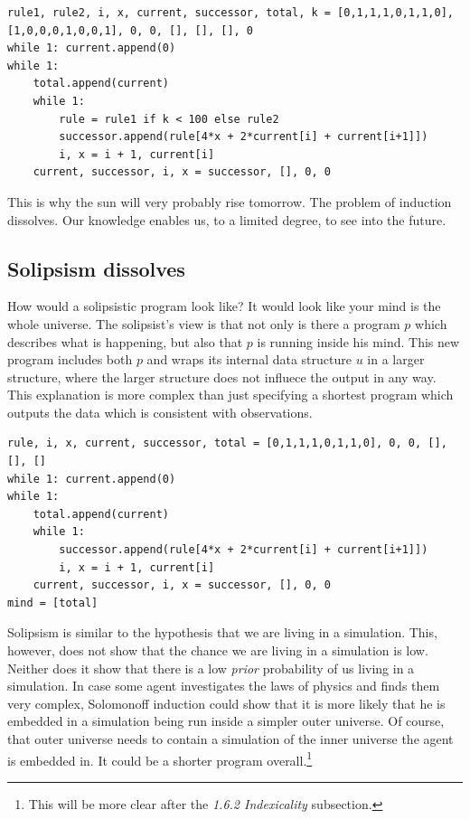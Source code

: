 \begin{lstlisting}[caption={A short program using one rule for the first 100 time steps, another rule from then on. This program is longer than just using the same rule all the time.}]
rule1, rule2, i, x, current, successor, total, k = [0,1,1,1,0,1,1,0], [1,0,0,0,1,0,0,1], 0, 0, [], [], [], 0
while 1: current.append(0)
while 1:
	total.append(current)
	while 1:
		rule = rule1 if k < 100 else rule2
		successor.append(rule[4*x + 2*current[i] + current[i+1]])
		i, x = i + 1, current[i]
	current, successor, i, x = successor, [], 0, 0
\end{lstlisting}

This is why the sun will very probably rise tomorrow.
The problem of induction dissolves.
Our knowledge enables us, to a limited degree, to see into the future.

\newpage

\subsection{Solipsism dissolves}

How would a solipsistic program look like?
It would look like your mind is the whole universe.
The solipsist's view is that not only is there a program $p$ which describes what is happening, but also that $p$ is running inside his mind.
This new program includes both $p$ and wraps its internal data structure $u$ in a larger structure, where the larger structure does not influece the output in any way.
This explanation is more complex than just specifying a shortest program which outputs the data which is consistent with observations. 

\begin{lstlisting}[caption={A solipsistic program.}]
rule, i, x, current, successor, total = [0,1,1,1,0,1,1,0], 0, 0, [], [], []
while 1: current.append(0)
while 1:
	total.append(current)
	while 1:
		successor.append(rule[4*x + 2*current[i] + current[i+1]])
		i, x = i + 1, current[i]
	current, successor, i, x = successor, [], 0, 0
mind = [total]
\end{lstlisting}

Solipsism is similar to the hypothesis that we are living in a simulation.
This, however, does not show that the chance we are living in a simulation is low.
Neither does it show that there is a low \textit{prior} probability of us living in a simulation.
In case some agent investigates the laws of physics and finds them very complex, Solomonoff induction could show that it is more likely that he is embedded in a simulation being run inside a simpler outer universe.
Of course, that outer universe needs to contain a simulation of the inner universe the agent is embedded in.
It could be a shorter program overall.\footnote{This will be more clear after the \textit{1.6.2 Indexicality} subsection.}

